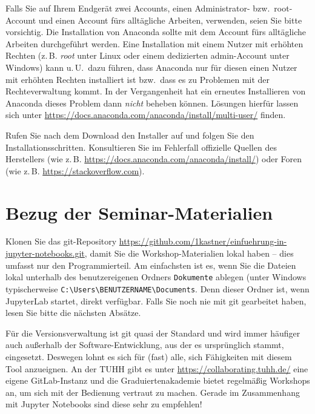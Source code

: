 \documentclass{tufte-handout}
\begin{document}
Falls Sie auf Ihrem Endgerät zwei Accounts, einen Administrator- bzw.\ root-Account und einen Account fürs alltägliche Arbeiten, verwenden, seien Sie bitte vorsichtig.
Die Installation von Anaconda sollte mit dem Account fürs alltägliche Arbeiten durchgeführt werden.
Eine Installation mit einem Nutzer mit erhöhten Rechten (z.\,B. \emph{root} unter Linux oder einem dedizierten admin-Account unter Windows) kann u.\,U.\ dazu führen, dass Anaconda nur für diesen einen Nutzer mit erhöhten Rechten installiert ist bzw.\ dass es zu Problemen mit der Rechteverwaltung kommt.
In der Vergangenheit hat ein erneutes Installieren von Anaconda dieses Problem dann \emph{nicht} beheben können.
Lösungen hierfür lassen sich unter \url{https://docs.anaconda.com/anaconda/install/multi-user/} finden.

Rufen Sie nach dem Download den Installer auf und folgen Sie den Installationsschritten.
Konsultieren Sie im Fehlerfall offizielle Quellen des Herstellers (wie z.\,B. \url{https://docs.anaconda.com/anaconda/install/}) oder Foren (wie z.\,B. \url{https://stackoverflow.com}).


\section{Bezug der Seminar-Materialien}
\label{sec:git-clone}

Klonen Sie das git-Repository
\url{https://github.com/1kastner/einfuehrung-in-jupyter-notebooks.git},
damit Sie die Workshop-Materialien lokal haben -- dies umfasst nur den Programmierteil.
Am einfachsten ist es, wenn Sie die Dateien lokal unterhalb des benutzer\-eigenen Ordners \texttt{Dokumente} ablegen
(unter Windows typischerweise \texttt{C:\textbackslash{}Users\textbackslash{}BENUTZERNAME\textbackslash{}Documents}.
Denn dieser Ordner ist, wenn JupyterLab startet, direkt verfügbar.
Falls Sie noch nie mit git gearbeitet haben, lesen Sie bitte die nächsten Absätze.

Für die Versionsverwaltung ist git quasi der Standard und wird immer häufiger auch außerhalb der Software-Entwicklung, aus der es ursprünglich stammt, eingesetzt.
Deswegen lohnt es sich für (fast) alle, sich Fähigkeiten mit diesem Tool anzueignen.
An der TUHH gibt es unter
\url{https://collaborating.tuhh.de/}
eine eigene GitLab-Instanz und die Graduiertenakademie bietet regelmäßig Workshops an, um sich mit der Bedienung vertraut zu machen.
Gerade im Zusammenhang mit Jupyter Notebooks sind diese sehr zu empfehlen!
\end{document}
